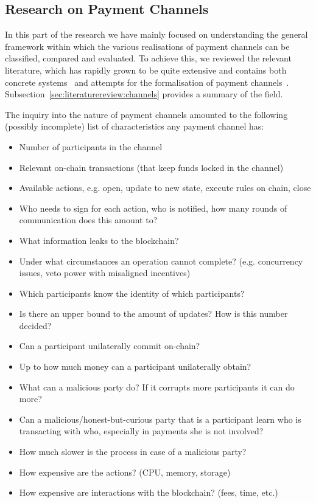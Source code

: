 \subsection{Research on Payment Channels}
  In this part of the research we have mainly focused on understanding the general
  framework within which the various realisations of payment channels can be classified,
  compared and evaluated. To achieve this, we reviewed the relevant literature, which has
  rapidly grown to be quite extensive and contains both concrete
  systems~\cite{abunchofthings} and attempts for the formalisation of payment
  channels~\cite{statechannels}. Subsection~\ref{sec:literaturereview:channels} provides a
  summary of the field.

  The inquiry into the nature of payment channels amounted to the following (possibly
  incomplete) list of characteristics any payment channel has:
  \begin{itemize}
    \item Number of participants in the channel
    \item Relevant on-chain transactions (that keep funds locked in the channel)
    \item Available actions, e.g. open, update to new state, execute rules on chain, close
    \item Who needs to sign for each action, who is notified, how many rounds of
    communication does this amount to?
    \item What information leaks to the blockchain?
    \item Under what circumstances an operation cannot complete? (e.g. concurrency issues,
    veto power with misaligned incentives)
    \item Which participants know the identity of which participants?
    \item Is there an upper bound to the amount of updates? How is this number decided?
    \item Can a participant unilaterally commit on-chain?
    \item Up to how much money can a participant unilaterally obtain?
    \item What can a malicious party do? If it corrupts more participants it can do more?
    \item Can a malicious/honest-but-curious party that is a participant learn who is
    transacting with who, especially in payments she is not involved?
    \item How much slower is the process in case of a malicious party?
    \item How expensive are the actions? (CPU, memory, storage)
    \item How expensive are interactions with the blockchain? (fees, time, etc.)
  \end{itemize}
